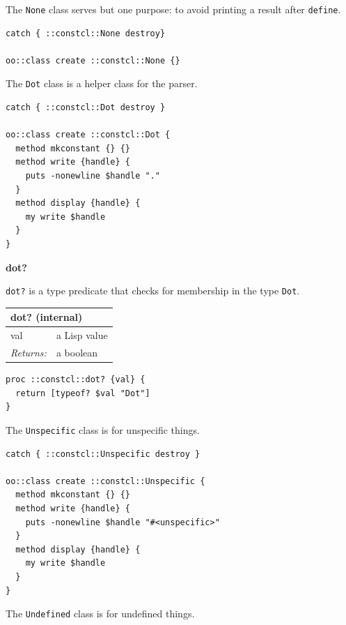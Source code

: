 \documentclass[twoside,9pt]{report}
\begin{document}
The \texttt{None} class serves but one purpose: to avoid printing a result after \texttt{define}.

\noindent\makebox[\linewidth]{\rule{\linewidth}{0.4pt}}
\begin{lstlisting}
catch { ::constcl::None destroy}
 
oo::class create ::constcl::None {}
\end{lstlisting}
\noindent\makebox[\linewidth]{\rule{\linewidth}{0.4pt}}

The \texttt{Dot} class is a helper class for the parser.

\noindent\makebox[\linewidth]{\rule{\linewidth}{0.4pt}}
\begin{lstlisting}
catch { ::constcl::Dot destroy }
 
oo::class create ::constcl::Dot {
  method mkconstant {} {}
  method write {handle} {
    puts -nonewline $handle "."
  }
  method display {handle} {
    my write $handle
  }
}
\end{lstlisting}
\noindent\makebox[\linewidth]{\rule{\linewidth}{0.4pt}}

\textbf{dot?}


\texttt{dot?} is a type predicate that checks for membership in the type \texttt{Dot}.

\begin{tabular}{ |l l| }
\hline
\multicolumn{2}{|l|}{dot? (internal)} \\
\hline
val & a Lisp value \\
\textit{Returns:} & a boolean \\
\hline
\end{tabular}

\noindent\makebox[\linewidth]{\rule{\linewidth}{0.4pt}}
\begin{lstlisting}
proc ::constcl::dot? {val} {
  return [typeof? $val "Dot"]
}
\end{lstlisting}
\noindent\makebox[\linewidth]{\rule{\linewidth}{0.4pt}}

The \texttt{Unspecific} class is for unspecific things.

\noindent\makebox[\linewidth]{\rule{\linewidth}{0.4pt}}
\begin{lstlisting}
catch { ::constcl::Unspecific destroy }
 
oo::class create ::constcl::Unspecific {
  method mkconstant {} {}
  method write {handle} {
    puts -nonewline $handle "#<unspecific>"
  }
  method display {handle} {
    my write $handle
  }
}
\end{lstlisting}
\noindent\makebox[\linewidth]{\rule{\linewidth}{0.4pt}}

The \texttt{Undefined} class is for undefined things.
\end{document}
